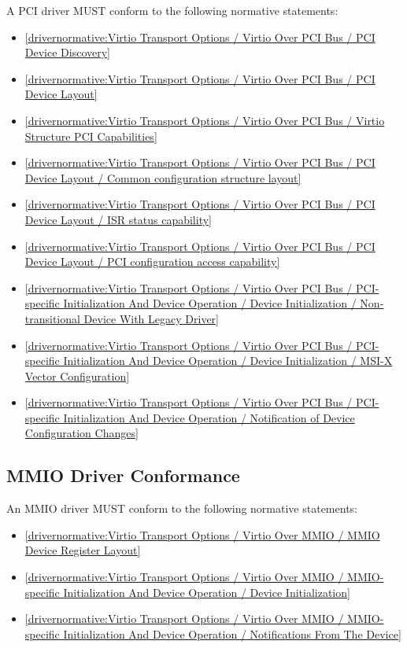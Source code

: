 A PCI driver MUST conform to the following normative statements:

\begin{itemize}
\item \ref{drivernormative:Virtio Transport Options / Virtio Over PCI Bus / PCI Device Discovery}
\item \ref{drivernormative:Virtio Transport Options / Virtio Over PCI Bus / PCI Device Layout}
\item \ref{drivernormative:Virtio Transport Options / Virtio Over PCI Bus / Virtio Structure PCI Capabilities}
\item \ref{drivernormative:Virtio Transport Options / Virtio Over PCI Bus / PCI Device Layout / Common configuration structure layout}
\item \ref{drivernormative:Virtio Transport Options / Virtio Over PCI Bus / PCI Device Layout / ISR status capability}
\item \ref{drivernormative:Virtio Transport Options / Virtio Over PCI Bus / PCI Device Layout / PCI configuration access capability}
\item \ref{drivernormative:Virtio Transport Options / Virtio Over PCI Bus / PCI-specific Initialization And Device Operation / Device Initialization / Non-transitional Device With Legacy Driver}
\item \ref{drivernormative:Virtio Transport Options / Virtio Over PCI Bus / PCI-specific Initialization And Device Operation / Device Initialization / MSI-X Vector Configuration}
\item \ref{drivernormative:Virtio Transport Options / Virtio Over PCI Bus / PCI-specific Initialization And Device Operation / Notification of Device Configuration Changes}
\end{itemize}

\subsection{MMIO Driver Conformance}\label{sec:Conformance / Driver Conformance / MMIO Driver Conformance}

An MMIO driver MUST conform to the following normative statements:

\begin{itemize}
\item \ref{drivernormative:Virtio Transport Options / Virtio Over MMIO / MMIO Device Register Layout}
\item \ref{drivernormative:Virtio Transport Options / Virtio Over MMIO / MMIO-specific Initialization And Device Operation / Device Initialization}
\item \ref{drivernormative:Virtio Transport Options / Virtio Over MMIO / MMIO-specific Initialization And Device Operation / Notifications From The Device}
\end{itemize}

